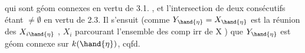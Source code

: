 
qui sont géom connexes en vertu de 3.1. , et  l'intersection
de deux consécutifs étant $\neq \emptyset$ en vertu de 2.3. Il s'ensuit (comme
$Y_{\hand{\eta}} = X_{\hand{\eta}}$ est la réunion des $X_{i\hand{\eta}}$ , $X_i$ parcourant l'ensemble des comp
irr de X ) que  $Y_{\hand{\eta}}$ est géom connexe sur $k(\hand{\eta})$, cqfd.

